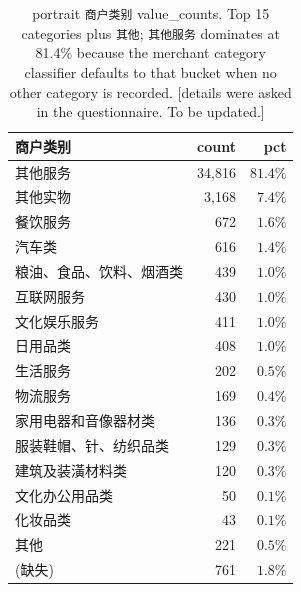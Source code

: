 \documentclass[11pt,letterpaper,english,final]{article}
\begin{document}
\begin{table}[H]
\centering
\small
\setlength{\tabcolsep}{6pt}
\caption{portrait \texttt{商户类别} value\_counts. Top 15 categories plus \texttt{其他}; \texttt{其他服务} dominates at 81.4\% because the merchant category classifier defaults to that bucket when no other category is recorded. {\color{cyan}[details were asked in the questionnaire. To be updated.]}}
\label{tab:sector}
\begin{tabular}{@{}l r r@{}}
\toprule
{商户类别} & {count} & {pct} \\
\midrule
其他服务               & 34{,}816 & $81.4\%$ \\
其他实物               & 3{,}168  & $7.4\%$  \\
餐饮服务               & 672      & $1.6\%$  \\
汽车类                 & 616      & $1.4\%$  \\
粮油、食品、饮料、烟酒类 & 439    & $1.0\%$  \\
互联网服务             & 430      & $1.0\%$  \\
文化娱乐服务           & 411      & $1.0\%$  \\
日用品类               & 408      & $1.0\%$  \\
生活服务               & 202      & $0.5\%$  \\
物流服务               & 169      & $0.4\%$  \\
家用电器和音像器材类     & 136    & $0.3\%$  \\
服装鞋帽、针、纺织品类   & 129    & $0.3\%$  \\
建筑及装潢材料类         & 120    & $0.3\%$  \\
文化办公用品类           & 50     & $0.1\%$  \\
化妆品类               & 43       & $0.1\%$  \\
其他                   & 221      & $0.5\%$  \\
\midrule
(缺失)                 & 761      & $1.8\%$ \\
\bottomrule
\end{tabular}
\end{table}
\end{document}
